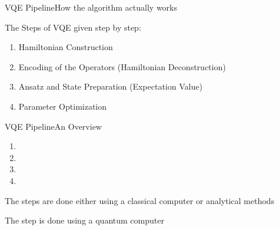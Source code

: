 \begin{frame}{VQE Pipeline}{How the algorithm actually works}

The Steps of VQE given step by step:
\vspace{2mm}
\begin{enumerate}
    \item Hamiltonian Construction 
    \item Encoding of the Operators (Hamiltonian Deconstruction)
    \item Ansatz and State Preparation (Expectation Value)
    \item Parameter Optimization
\end{enumerate}

\end{frame}

\begin{frame}{VQE Pipeline}{An Overview}


\vspace{2mm}
\begin{enumerate}
    \item {}
    \item {}
    \item {}
    \item {}
\end{enumerate}
\vspace{5mm}
The  steps are done either using a classical computer or analytical methods

\vspace{5mm}
The  step is done using a quantum computer

\end{frame}


